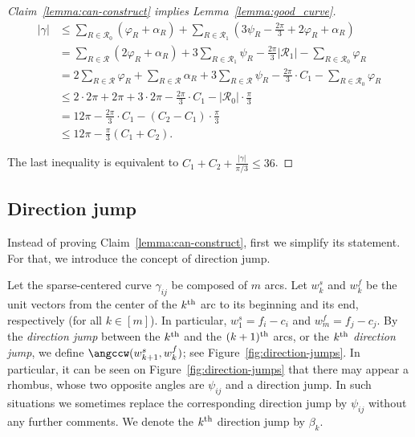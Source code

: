 \begin{proof}[Claim~\ref{lemma:can-construct} implies Lemma~\ref{lemma:good_curve}]
\begin{align*}
    |\gamma| &\leq \sum_{R\in\mathcal{R}_0}(\varphi_R + \alpha_R) + \sum_{R\in\mathcal{R}_1}\left(3\psi_R - \frac{2\pi}{3} + 2\varphi_R + \alpha_R\right)  \\
    &= \sum_{R\in\mathcal{R}}(2\varphi_R + \alpha_R) + 3\sum_{R\in\mathcal{R}_1}\psi_R - \frac{2\pi}{3}|\mathcal{R}_1| - \sum_{R\in\mathcal{R}_0}\varphi_R  \\
    &= 2\sum_{R\in\mathcal{R}}\varphi_R + \sum_{R\in\mathcal{R}}\alpha_R + 3\sum_{R\in\mathcal{R}}\psi_R - \frac{2\pi}{3}\cdot C_1 - \sum_{R\in\mathcal{R}_0}\varphi_R  \\
    &\leq 2\cdot 2\pi + 2\pi + 3\cdot 2\pi - \frac{2\pi}{3}\cdot C_1 - |\mathcal{R}_0|\cdot\frac{\pi}{3}  \\
    &= 12\pi - \frac{2\pi}{3}\cdot C_1 - (C_2 - C_1)\cdot\frac{\pi}{3}  \\
    &\leq 12\pi - \frac{\pi}{3}(C_1 + C_2).
\end{align*}

The last inequality is equivalent to $C_1 + C_2 + \frac{|\gamma|}{\pi/3}\leq 36$.
\end{proof}


\subsection{Direction jump}

Instead of proving Claim~\ref{lemma:can-construct}, first we simplify its statement. For that, we introduce the concept of direction jump.

Let the sparse-centered curve $\gamma_{ij}$ be composed of $m$ arcs. Let $w_k^s$ and $w_k^f$ be the unit vectors from the center of the $k\textsuperscript{th}$ arc to its beginning and its end, respectively (for all $k\in[m]$). In particular, $w_1^s = f_i - c_i$ and $w_m^f = f_j - c_j$. By the \emph{direction jump} between the $k\textsuperscript{th}$ and the $(k+1)\textsuperscript{th}$ arcs, or the \emph{$k\textsuperscript{th}$ direction jump}, we define $\angccw(w_{k+1}^s, w_k^f)$; see Figure~\ref{fig:direction-jumps}. In particular, it can be seen on Figure~\ref{fig:direction-jumps} that there may appear a rhombus, whose two opposite angles are $\psi_{ij}$ and a direction jump. In such situations we sometimes replace the corresponding direction jump by $\psi_{ij}$ without any further comments. We denote the $k\textsuperscript{th}$ direction jump by $\beta_k$.

